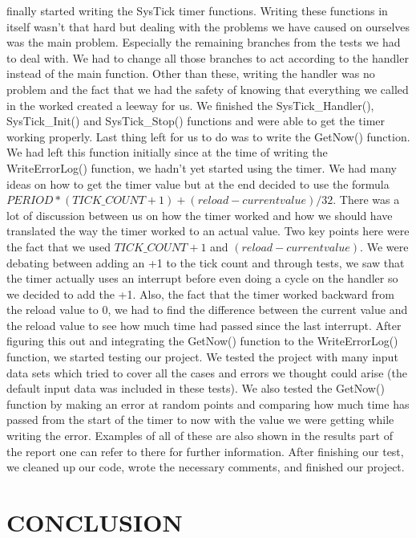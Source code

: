 \documentclass[pdftex,12pt,a4paper]{article}
\begin{document}
finally started writing the SysTick timer functions. Writing these functions in itself wasn't that hard but dealing with the problems we have caused on ourselves was the main problem. Especially the remaining branches from the tests we had to deal with. We had to change all those branches to act according to the handler instead of the main function. Other than these, writing the handler was no problem and the fact that we had the safety of knowing that everything we called in the worked created a leeway for us. We finished the SysTick\_Handler(), SysTick\_Init() and SysTick\_Stop() functions and were able to get the timer working properly. Last thing left for us to do was to write the GetNow() function. We had left this function initially since at the time of writing the WriteErrorLog() function, we hadn't yet started using the timer. We had many ideas on how to get the timer value but at the end decided to use the formula $PERIOD*(TICK\_COUNT+1) + (reload - current value)/32$. There was a lot of discussion between us on how the timer worked and how we should have translated the way the timer worked to an actual value. Two key points here were the fact that we used $TICK\_COUNT+1$ and $(reload - current value)$. We were debating between adding an +1 to the tick count and through tests, we saw that the timer actually uses an interrupt before even doing a cycle on the handler so we decided to add the +1. Also, the fact that the timer worked backward from the reload value to 0, we had to find the difference between the current value and the reload value to see how much time had passed since the last interrupt. After figuring this out and integrating the GetNow() function to the WriteErrorLog() function, we started testing our project. We tested the project with many input data sets which tried to cover all the cases and errors we thought could arise (the default input data was included in these tests). We also tested the GetNow() function by making an error at random points and comparing how much time has passed from the start of the timer to now with the value we were getting while writing the error. Examples of all of these are also shown in the results part of the report one can refer to there for further information. After finishing our test, we cleaned up our code, wrote the necessary comments, and finished our project.

\section{CONCLUSION}
\end{document}
